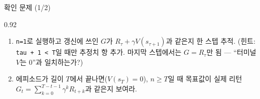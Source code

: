\begin{frame}{확인 문제 (1/2)}
\begin{center}\begin{varwidth}{0.92\textwidth}
  \begin{enumerate}
    \item {} \texttt{n=1}로
      실행하고 갱신에 쓰인 $G$가
      $R_\tau + \gamma V(s_{\tau+1})$과 같은지 한 스텝 추적.
      (힌트: \texttt{tau + 1 < T}일 때만 추정치 항 추가. 마지막
      스텝에서는 $G = R_\tau$만 됨 --- ``터미널 $V$는 0''과 일치하는가?)
    \item {} 에피소드가 길이 $T$에서
      끝나면($V(s_T)=0$), $n \ge T$일 때 목표값이 실제 리턴
      $G_t = \sum_{k=0}^{T-t-1} \gamma^k R_{t+k}$과 같은지 보여라.
  \end{enumerate}
\end{varwidth}\end{center}
\end{frame}
